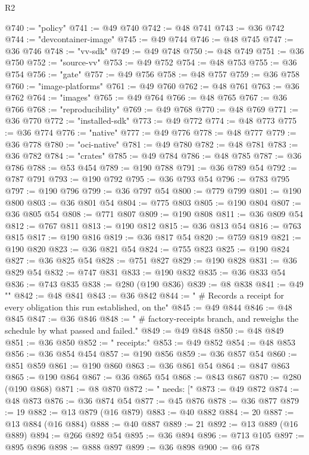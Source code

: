 \begin{lexlean}{R2}
\begin{coremodule}
@740 := "policy"
@741 := @49 @740
@742 := @48 @741
@743 := @36 @742
@744 := "devcontainer-image"
@745 := @49 @744
@746 := @48 @745
@747 := @36 @746
@748 := "vv-sdk"
@749 := @49 @748
@750 := @48 @749
@751 := @36 @750
@752 := "source-vv"
@753 := @49 @752
@754 := @48 @753
@755 := @36 @754
@756 := "gate"
@757 := @49 @756
@758 := @48 @757
@759 := @36 @758
@760 := "image-platforms"
@761 := @49 @760
@762 := @48 @761
@763 := @36 @762
@764 := "images"
@765 := @49 @764
@766 := @48 @765
@767 := @36 @766
@768 := "reproducibility"
@769 := @49 @768
@770 := @48 @769
@771 := @36 @770
@772 := "installed-sdk"
@773 := @49 @772
@774 := @48 @773
@775 := @36 @774
@776 := "native"
@777 := @49 @776
@778 := @48 @777
@779 := @36 @778
@780 := "oci-native"
@781 := @49 @780
@782 := @48 @781
@783 := @36 @782
@784 := "crates"
@785 := @49 @784
@786 := @48 @785
@787 := @36 @786
@788 := @53 @454
@789 := @190 @788
@791 := @36 @789 @54
@792 := @787 @791
@793 := @190 @792
@795 := @36 @793 @54
@796 := @783 @795
@797 := @190 @796
@799 := @36 @797 @54
@800 := @779 @799
@801 := @190 @800
@803 := @36 @801 @54
@804 := @775 @803
@805 := @190 @804
@807 := @36 @805 @54
@808 := @771 @807
@809 := @190 @808
@811 := @36 @809 @54
@812 := @767 @811
@813 := @190 @812
@815 := @36 @813 @54
@816 := @763 @815
@817 := @190 @816
@819 := @36 @817 @54
@820 := @759 @819
@821 := @190 @820
@823 := @36 @821 @54
@824 := @755 @823
@825 := @190 @824
@827 := @36 @825 @54
@828 := @751 @827
@829 := @190 @828
@831 := @36 @829 @54
@832 := @747 @831
@833 := @190 @832
@835 := @36 @833 @54
@836 := @743 @835
@838 := @280 (@190 @836)
@839 := @8 @838
@841 := @49 ""
@842 := @48 @841
@843 := @36 @842
@844 := "  # Records a receipt for every obligation this run established, on the"
@845 := @49 @844
@846 := @48 @845
@847 := @36 @846
@848 := "  # factory-receipts branch, and reweighs the schedule by what passed and failed."
@849 := @49 @848
@850 := @48 @849
@851 := @36 @850
@852 := "  receipts:"
@853 := @49 @852
@854 := @48 @853
@856 := @36 @854 @454
@857 := @190 @856
@859 := @36 @857 @54
@860 := @851 @859
@861 := @190 @860
@863 := @36 @861 @54
@864 := @847 @863
@865 := @190 @864
@867 := @36 @865 @54
@868 := @843 @867
@870 := @280 (@190 @868)
@871 := @8 @870
@872 := "    needs: ["
@873 := @49 @872
@874 := @48 @873
@876 := @36 @874 @54
@877 := @45 @876
@878 := @36 @877
@879 := 19
@882 := @13 @879 (@16 @879)
@883 := @40 @882
@884 := 20
@887 := @13 @884 (@16 @884)
@888 := @40 @887
@889 := 21
@892 := @13 @889 (@16 @889)
@894 := @266 @892 @54
@895 := @36 @894
@896 := @713 @105
@897 := @895 @896
@898 := @888 @897
@899 := @36 @898
@900 := @6 @78

\end{coremodule}
\end{lexlean}
